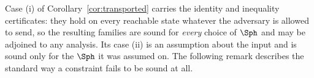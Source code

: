 
Case (i) of Corollary~\ref{cor:transported} carries the identity and
inequality certificates: they hold on every reachable state whatever the
adversary is allowed to send, so the resulting families are sound for
\emph{every} choice of $\Sph$ and may be adjoined to any analysis. Its case
(ii) is an assumption about the input and is sound only for the $\Sph$ it was
assumed on. The following remark describes the standard way a constraint
fails to be sound at all.

